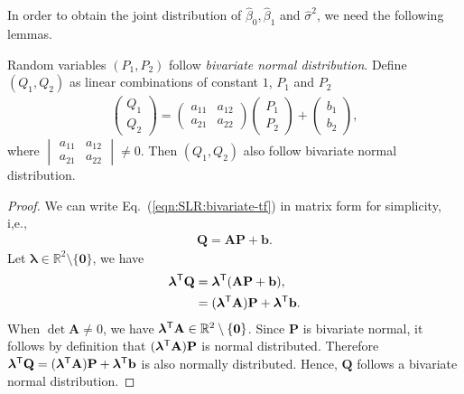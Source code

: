 \documentclass{book}
\begin{document}
In order to obtain the joint distribution of $\hat{\beta}_0, \hat{\beta}_1$ and $\hat{\sigma}^2$, we need the following lemmas.

\lemma 
\label{lam:SLR:bivariate-tf}
Random variables $(P_1, P_2)$ follow \textit{bivariate normal distribution}. Define $(Q_1, Q_2)$ as linear combinations of constant $1$, $P_1$ and $P_2$
\begin{align}
    \begin{pmatrix}
        Q_1\\Q_2
    \end{pmatrix}
    =
    \begin{pmatrix}
        a_{11} & a_{12} \\
        a_{21} & a_{22} 
    \end{pmatrix}
    \begin{pmatrix}
        P_1\\P_2
    \end{pmatrix} 
    + 
    \begin{pmatrix}
        b_1\\b_2
    \end{pmatrix},
    \label{eqn:SLR:bivariate-tf}
\end{align}
where 
$\begin{vmatrix}
a_{11} & a_{12}\\
a_{21} & a_{22} 
\end{vmatrix}
\neq 0$.
Then $(Q_1, Q_2)$ also follow bivariate normal distribution.

\begin{proof}
We can write Eq.~(\ref{eqn:SLR:bivariate-tf}) in matrix form for simplicity, i,e., 
\begin{align*}
    \mathbf{Q} = \mathbf{A} \mathbf{P} + \mathbf{b}.
\end{align*}
Let $\boldsymbol{\lambda} \in \mathbb{R}^2 \setminus \{\mathbf{0}\}$, we have 
\begin{align*}
    \boldsymbol{\lambda}^{\mathsf{T}}\mathbf{Q} &= \boldsymbol{\lambda}^{\mathsf{T}}(\mathbf{A} \mathbf{P} + \mathbf{b}), \\
    &= (\boldsymbol{\lambda}^{\mathsf{T}}\mathbf{A}) \mathbf{P} + \boldsymbol{\lambda}^{\mathsf{T}}\mathbf{b}.
\end{align*}
When $\det \mathbf{A} \neq 0$, we have $\boldsymbol{\lambda}^{\mathsf{T}}\mathbf{A} \in \mathbb{R}^2 \setminus \{\mathbf{0}\}$. 
Since $\mathbf{P}$ is bivariate normal, it follows by definition that $(\boldsymbol{\lambda}^{\mathsf{T}}\mathbf{A}) \mathbf{P}$ is normal distributed. 
Therefore $\boldsymbol{\lambda}^{\mathsf{T}}\mathbf{Q} = (\boldsymbol{\lambda}^{\mathsf{T}}\mathbf{A}) \mathbf{P} + \boldsymbol{\lambda}^{\mathsf{T}}\mathbf{b}$ is also normally distributed.
Hence, $\mathbf{Q}$ follows a bivariate normal distribution.
\end{proof}
\end{document}
